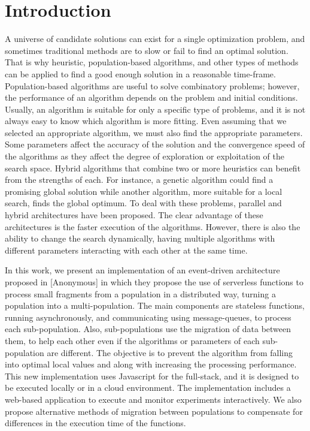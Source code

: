 \documentclass[runningheads]{llncs}
\begin{document}
\section{Introduction}
A universe of candidate solutions can exist for a single optimization problem,
and sometimes traditional methods are to slow or fail to find an optimal
solution. That is why heuristic, population-based algorithms, and other types of
methods can be applied to find a good enough solution in a reasonable
time-frame. Population-based algorithms are useful to solve combinatory
problems; however,  the performance of an algorithm depends on the problem and
initial conditions. Usually, an algorithm is suitable for only a specific type
of problems, and it is not always easy to know which algorithm is more fitting.
Even assuming that we selected an appropriate algorithm, we must also find the
appropriate parameters.  Some parameters affect the accuracy of the solution and
the convergence speed of the algorithms as they affect the degree of exploration
or exploitation of the search space.  Hybrid algorithms that combine two or more
heuristics can benefit from the strengths of each. For instance, a genetic
algorithm could find a promising global solution while another algorithm, more
suitable for a local search, finds the global optimum. To deal with these problems,
parallel and hybrid architectures have been proposed. The clear advantage of
these architectures is the faster execution of the algorithms. However, there is
also the ability to change the search dynamically, having multiple algorithms
with different parameters interacting with each other at the same time. 

In this work, we present an implementation of an event-driven architecture
proposed in [Anonymous] in which they propose the use of serverless functions to
process small fragments from a population in a distributed way, turning a
population into a multi-population. The main components are stateless functions,
running asynchronously, and communicating using message-queues, to process each
sub-population. Also, sub-populations use the migration of data between them, to
help each other even if the algorithms or parameters of each sub-population are
different. The objective is to prevent the algorithm from falling into optimal
local values and along with increasing the processing performance. This new
implementation uses Javascript for the full-stack, and it is designed to be
executed locally or in a cloud environment. The implementation includes a
web-based application to execute and monitor experiments interactively.  We also
propose alternative methods of migration between populations to compensate for
differences in the execution time of the functions.  
\end{document}
